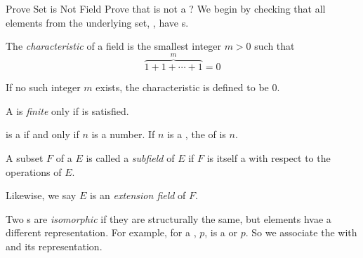 \begin{example}{Prove Set is Not Field}
  Prove that  is not a ?
  \tcblower{}
  We begin by checking that all elements from the underlying set, , have s.
\end{example}

\begin{definition}[Characteristic]\label{def:Field_Characteristic}
  The \emph{characteristic} of a field is the smallest integer $m > 0$ such that
  \begin{equation}\label{eq:Field_Characteristic}
    \overbrace{1 + 1 + \cdots + 1}^{m} = 0
  \end{equation}

  If no such integer $m$ exists, the characteristic is defined to be 0.
\end{definition}

\begin{definition}\label{def:Finite_Field}
  A  is \emph{finite} only if  is satisfied.
\end{definition}

\begin{theorem}\label{thm:Finite_Field}
  \TextIntsModN{} is a  if and only if $n$ is a  number.
  If $n$ is a , the  of \TextIntsModN{} is $n$.
\end{theorem}

\begin{definition}[Subfield]\label{def:Subfield}
  A subset $F$ of a  $E$ is called a \emph{subfield} of $E$ if $F$ is itself a  with respect to the operations of $E$.
  
  \begin{remark}\label{rmk:Extension_Field}
    Likewise, we say $E$ is an \emph{extension field} of $F$.
  \end{remark}
\end{definition}

\begin{definition}[Isomorphism]\label{def:Isomorphism}
  Two s are \emph{isomorphic} if they are structurally the same, but elements hvae a different representation.
  For example, for a , $p$,  is a  or  $p$.
  So we associate the   with  and its representation.
\end{definition}

